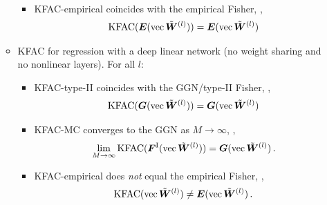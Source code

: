 \begin{itemize}
\begin{itemize}
\begin{itemize}
\begin{align*}
            \end{align*}
          \item KFAC-empirical coincides with the empirical Fisher, \ie,
            \begin{align*}
              \mathrm{KFAC}({\bm{E}}(\operatorname{vec}\tilde{{\bm{W}}}^{(l)})) = {\bm{E}}(\operatorname{vec} \tilde{{\bm{W}}}^{(l)})
            \end{align*}
        \end{itemize}
      \item KFAC for regression with a deep linear network (no weight sharing and no nonlinear layers). For all $l$:
        \begin{itemize}
          \item KFAC-type-II coincides with the GGN/type-II Fisher, \ie,
            \begin{align*}
              \mathrm{KFAC}({\bm{G}}(\operatorname{vec} \tilde{{\bm{W}}}^{(l)})) = {\bm{G}}(\operatorname{vec} \tilde{{\bm{W}}}^{(l)})
            \end{align*}
          \item KFAC-MC converges to the GGN as $M\rightarrow\infty$, \ie,
            \begin{align*}
              \lim_{M \to \infty} \mathrm{KFAC}({\bm{F}}^{\text{I}}(\operatorname{vec} \tilde{{\bm{W}}}^{(l)})) = {\bm{G}}(\operatorname{vec} \tilde{{\bm{W}}}^{(l)})\,.
            \end{align*}
          \item KFAC-empirical does \emph{not} equal the empirical Fisher, \ie,
            \begin{align*}
              \mathrm{KFAC}(\operatorname{vec} \tilde{{\bm{W}}}^{(l)})
              \neq
              {\bm{E}}(\operatorname{vec} \tilde{{\bm{W}}}^{(l)})\,.
            \end{align*}
        \end{itemize}
      \end{itemize}
    \end{itemize}

